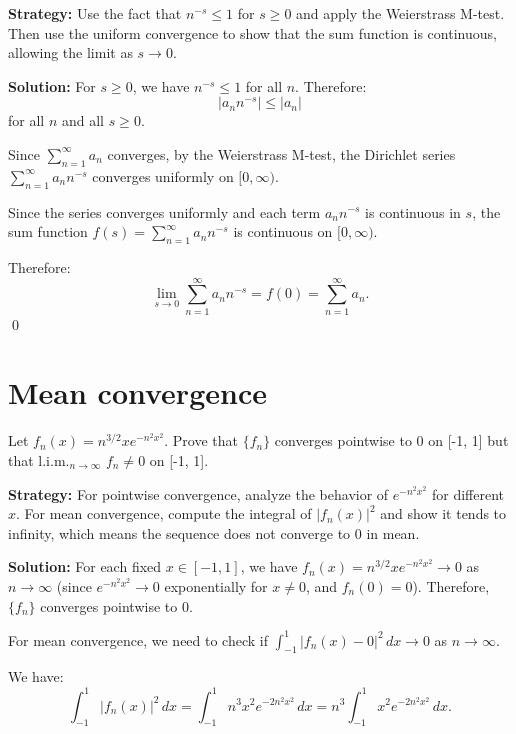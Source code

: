 \noindent\textbf{Strategy:} Use the fact that \( n^{-s} \leq 1 \) for \( s \geq 0 \) and apply the Weierstrass M-test. Then use the uniform convergence to show that the sum function is continuous, allowing the limit as \( s \to 0 \).

\bigskip\noindent\textbf{Solution:} For \( s \geq 0 \), we have \( n^{-s} \leq 1 \) for all \( n \). Therefore:
\[|a_n n^{-s}| \leq |a_n|\]
for all \( n \) and all \( s \geq 0 \).

Since \( \sum_{n=1}^{\infty} a_n \) converges, by the Weierstrass M-test, the Dirichlet series \( \sum_{n=1}^{\infty} a_n n^{-s} \) converges uniformly on \( [0, \infty) \).

Since the series converges uniformly and each term \( a_n n^{-s} \) is continuous in \( s \), the sum function \( f(s) = \sum_{n=1}^{\infty} a_n n^{-s} \) is continuous on \( [0, \infty) \).

Therefore:
\[\lim_{s \to 0} \sum_{n=1}^{\infty} a_n n^{-s} = f(0) = \sum_{n=1}^{\infty} a_n.\]\qed
\section{Mean convergence}



\begin{problembox}
\begin{problemstatement}
Let \( f_n(x) = n^{3/2}xe^{-n^2x^2} \). Prove that \( \{f_n\} \) converges pointwise to 0 on [-1, 1] but that l.i.m.\(_{n\to\infty}\) \( f_n \neq 0 \) on [-1, 1].
\end{problemstatement}
\end{problembox}

\noindent\textbf{Strategy:} For pointwise convergence, analyze the behavior of \( e^{-n^2x^2} \) for different \( x \). For mean convergence, compute the integral of \( |f_n(x)|^2 \) and show it tends to infinity, which means the sequence does not converge to 0 in mean.

\bigskip\noindent\textbf{Solution:} For each fixed \( x \in [-1, 1] \), we have \( f_n(x) = n^{3/2}xe^{-n^2x^2} \to 0 \) as \( n \to \infty \) (since \( e^{-n^2x^2} \to 0 \) exponentially for \( x \neq 0 \), and \( f_n(0) = 0 \)). Therefore, \( \{f_n\} \) converges pointwise to 0.

For mean convergence, we need to check if \( \int_{-1}^1 |f_n(x) - 0|^2 \, dx \to 0 \) as \( n \to \infty \).

We have:
\[\int_{-1}^1 |f_n(x)|^2 \, dx = \int_{-1}^1 n^3 x^2 e^{-2n^2x^2} \, dx = n^3 \int_{-1}^1 x^2 e^{-2n^2x^2} \, dx.\]

